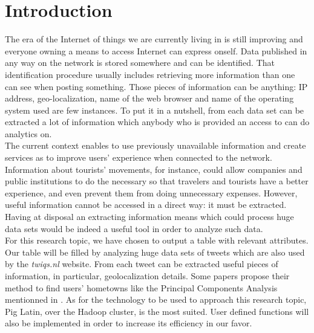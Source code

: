 \documentclass[conference]{doc}
\begin{document}
	\section{Introduction}
		\indent The era of the Internet of things we are currently living in is still
		improving and everyone owning a means to access Internet can express onself.
		Data published in any way on the network is stored somewhere and can be
		identified. That identification procedure usually includes retrieving more
		information than one can see when posting something. Those pieces of
		information can be anything: IP address, geo-localization, name of the web
		browser and name of the operating system used are few instances. To put it in
		a nutshell, from each data set can be extracted a lot of information which anybody who is provided an access to can do analytics on.\\
		\indent The current context enables to use previously unavailable information
		and create services as to improve users' experience when connected to the
		network. Information about tourists' movements, for instance, could allow
		companies and public institutions to do the necessary so that travelers and
		tourists have a better experience, and even prevent them from doing
		unnecessary expenses. However, useful information cannot be accessed in a
		direct way: it must be extracted. Having at disposal an extracting information
		means which could process huge data sets would be indeed a useful tool in
		order to analyze such data.\\
		\indent For this research topic, we have chosen to output a table with
		relevant attributes. Our table will be filled by analyzing huge data sets of
		tweets which are also used by the \emph{twiqs.nl} website. From each tweet can
		be extracted useful pieces of information, in particular, geolocalization
		details. Some papers propose their method to find users' hometowns like the
		Principal Components Analysis mentionned in \cite{1}. As for the technology to
		be used to approach this research topic, Pig Latin, over the Hadoop cluster,
		is the most suited. User defined functions will also be implemented in order
		to increase its efficiency in our favor.
		
\end{document}
